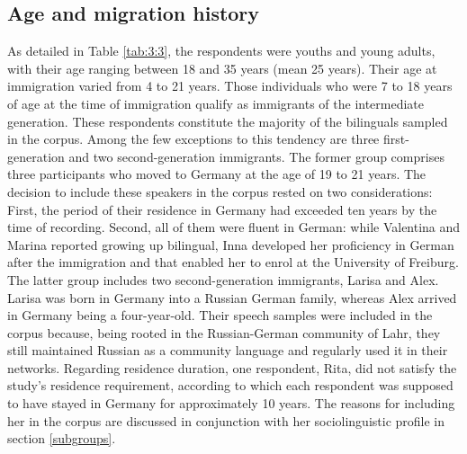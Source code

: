 \subsection{Age and migration history}
As detailed in Table \ref{tab:3:3}, the respondents were youths and young adults, with their age ranging between 18 and 35 years (mean 25 years). Their age at immigration varied from 4 to 21 years. Those individuals who were 7 to 18 years of age at the time of immigration qualify as immigrants of the intermediate generation. These respondents constitute the majority of the bilinguals sampled in the corpus. Among the few exceptions to this tendency are three first-generation and two second-generation immigrants. The former group comprises three participants who moved to Germany at the age of 19 to 21 years. The decision to include these speakers in the corpus rested on two considerations: First, the period of their residence in Germany had exceeded ten years by the time of recording. Second, all of them were fluent in German: while Valentina and Marina reported growing up bilingual, Inna developed her proficiency in German after the immigration and that enabled her to enrol at the University of Freiburg. The latter group includes two second-generation immigrants, Larisa and Alex. Larisa was born in Germany into a Russian German family, whereas Alex arrived in Germany being a four-year-old. Their speech samples were included in the corpus because, being rooted in the Russian-German community of Lahr, they still maintained Russian as a community language and regularly used it in their networks. Regarding residence duration, one respondent, Rita, did not satisfy the study's residence requirement, according to which each respondent was supposed to have stayed in Germany for approximately 10 years. The reasons for including her in the corpus are discussed in conjunction with her sociolinguistic profile in section \ref{subgroups}.





